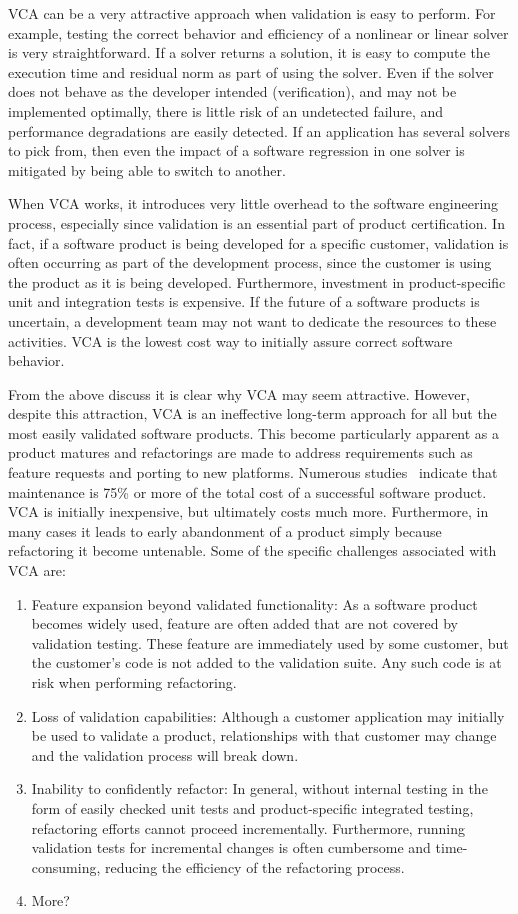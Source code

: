 \documentclass[11pt]{SANDreport}
\begin{document}
VCA can be a very attractive approach when validation is easy to perform.  For example, testing the correct behavior and efficiency of a nonlinear or linear solver is very straightforward.  If a solver returns a solution, it is easy to compute the execution time and residual norm as part of using the solver.  Even if the solver does not behave as the developer intended (verification), and may not be implemented optimally, there is little risk of an undetected failure, and performance degradations are easily detected.   If an application has several solvers to pick from, then even the impact of a software regression in one solver is mitigated by being able to switch to another. 

When VCA works, it introduces very little overhead to the software engineering process, especially since validation is an essential part of product certification.  In fact, if a software product is being developed for a specific customer, validation is often occurring as part of the development process, since the customer is using the product as it is being developed.  Furthermore, investment in product-specific unit and integration tests is expensive.  If the future of a software products is uncertain, a development team may not want to dedicate the resources to these activities.  VCA is the lowest cost way to initially assure correct software behavior.

From the above discuss it is clear why VCA may seem attractive.  However, despite this attraction, VCA is an ineffective long-term approach for all but the most easily validated software products.  This become particularly apparent as a product matures and refactorings are made to address requirements such as feature requests and porting to new platforms.  Numerous studies~\cite{} indicate that maintenance is 75\% or more of the total cost of a successful software product.  VCA is initially inexpensive, but ultimately costs much more.  Furthermore, in many cases it leads to early abandonment of a product simply because refactoring it become untenable.  Some of the specific challenges associated with VCA are:
\begin{enumerate}
\item Feature expansion beyond validated functionality:  As a software product becomes widely used, feature are often added that are not covered by validation testing.  These feature are immediately used by some customer, but the customer's code is not added to the validation suite.  Any such code is at risk when performing refactoring.
\item Loss of validation capabilities:  Although a customer application may initially be used to validate a product, relationships with that customer may change and the validation process will break down.
\item Inability to confidently refactor:  In general, without internal testing in the form of easily checked unit tests and product-specific integrated testing, refactoring efforts cannot proceed incrementally.  Furthermore, running validation tests for incremental changes is often cumbersome and time-consuming, reducing the efficiency of the refactoring process.
\item More?
\end{enumerate}
\end{document}
